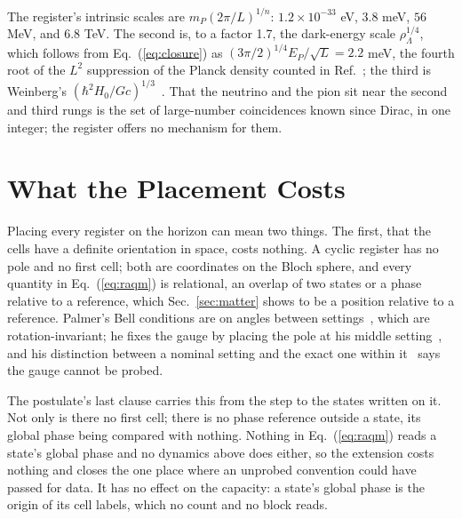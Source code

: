 \documentclass[aps,prd,twocolumn,superscriptaddress,nofootinbib]{revtex4-2}
\begin{document}
The register's intrinsic scales are $m_P(2\pi/L)^{1/n}$: $1.2\times10^{-33}$ eV, $3.8$ meV, $56$ MeV, and $6.8$ TeV. The second is, to a factor 1.7, the dark-energy scale $\rho_\Lambda^{1/4}$, which follows from Eq.~(\ref{eq:closure}) as $(3\pi/2)^{1/4}E_P/\sqrt L = 2.2$ meV, the fourth root of the $L^2$ suppression of the Planck density counted in Ref.~\cite{korytko2026b}; the third is Weinberg's $(\hbar^2H_0/Gc)^{1/3}$~\cite{weinberg1972}. That the neutrino and the pion sit near the second and third rungs is the set of large-number coincidences known since Dirac, in one integer; the register offers no mechanism for them.

\section{What the Placement Costs}
\label{sec:cost}

Placing every register on the horizon can mean two things. The first, that the cells have a definite orientation in space, costs nothing. A cyclic register has no pole and no first cell; both are coordinates on the Bloch sphere, and every quantity in Eq.~(\ref{eq:raqm}) is relational, an overlap of two states or a phase relative to a reference, which Sec.~\ref{sec:matter} shows to be a position relative to a reference. Palmer's Bell conditions are on angles between settings~\cite{palmer2026b}, which are rotation-invariant; he fixes the gauge by placing the pole at his middle setting~\cite{palmer2026c}, and his distinction between a nominal setting and the exact one within it~\cite{palmer2024} says the gauge cannot be probed.

The postulate's last clause carries this from the step to the states written on it. Not only is there no first cell; there is no phase reference outside a state, its global phase being compared with nothing. Nothing in Eq.~(\ref{eq:raqm}) reads a state's global phase and no dynamics above does either, so the extension costs nothing and closes the one place where an unprobed convention could have passed for data. It has no effect on the capacity: a state's global phase is the origin of its cell labels, which no count and no block reads.
\end{document}
